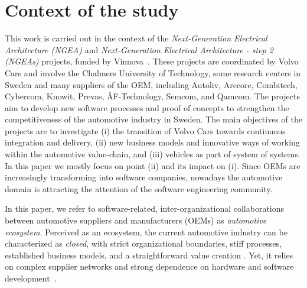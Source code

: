 \section{Context of the study}\label{sec:context}


This work is carried out in the context of the {\em Next-Generation Electrical Architecture (NGEA)} and {\em Next-Generation Electrical Architecture - step 2 (NGEAs)} projects, funded by Vinnova~\cite{Vinnova}. 
These projects are coordinated by Volvo Cars and involve the Chalmers University of Technology, some research centers in Sweden and many suppliers of the OEM, including Autoliv, Arccore, Combitech, Cybercom, Knowit, Prevas, \AA F-Technology, Semcom, and Qamcom. The projects aim to develop new software processes and proof of concepts to strengthen the competitiveness of the automotive industry in Sweden. 
The main objectives of the projects are to investigate (i) the transition of Volvo Cars towards continuous integration and %
{delivery}, (ii) new business models and innovative ways of working within the automotive %
value-chain, %
and (iii) vehicles as part of system of systems. 
In this paper we mostly focus on point (ii) %
and its impact on (i). %
Since OEMs are increasingly transforming into software companies, nowadays the automotive domain is attracting the attention of the software engineering community.  

{In this paper, we refer to software-related, }%
inter-organizational collaborations between automotive suppliers %
{and manufacturers (OEMs) as \emph{automotive ecosystem}}. %
Perceived as an ecosystem, the current automotive industry can be characterized as \emph{closed}, with strict organizational boundaries, stiff processes, established business models, and a straightforward value creation \cite{ConnectedVehicle2012}.
Yet, it relies on complex supplier networks  and strong dependence on hardware and software development~\cite{Knauss2014d}. %


